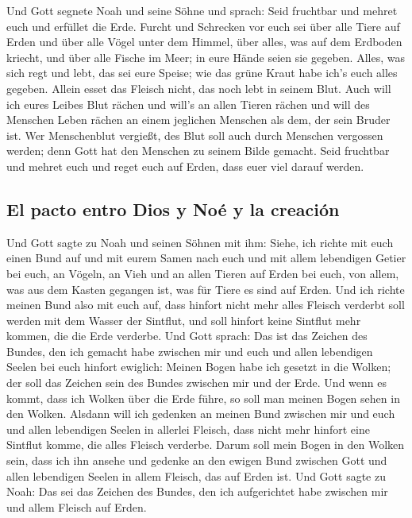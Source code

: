  Und Gott segnete Noah und seine Söhne und sprach: Seid
fruchtbar und mehret euch und erfüllet die Erde.  Furcht
und Schrecken vor euch sei über alle Tiere auf Erden und über alle Vögel
unter dem Himmel, über alles, was auf dem Erdboden kriecht, und über
alle Fische im Meer; in eure Hände seien sie gegeben. 
Alles, was sich regt und lebt, das sei eure Speise; wie das grüne Kraut
habe ich's euch alles gegeben.  Allein esset das Fleisch
nicht, das noch lebt in seinem Blut.  Auch will ich eures
Leibes Blut rächen und will's an allen Tieren rächen und will des
Menschen Leben rächen an einem jeglichen Menschen als dem, der sein
Bruder ist.  Wer Menschenblut vergießt, des Blut soll auch
durch Menschen vergossen werden; denn Gott hat den Menschen zu seinem
Bilde gemacht.  Seid fruchtbar und mehret euch und reget
euch auf Erden, dass euer viel darauf werden.

\hypertarget{el-pacto-entro-dios-y-nouxe9-y-la-creaciuxf3n}{%
\subsection{El pacto entro Dios y Noé y la
creación}\label{el-pacto-entro-dios-y-nouxe9-y-la-creaciuxf3n}}

 Und Gott sagte zu Noah und seinen Söhnen mit ihm:
 Siehe, ich richte mit euch einen Bund auf und mit eurem
Samen nach euch  und mit allem lebendigen Getier bei
euch, an Vögeln, an Vieh und an allen Tieren auf Erden bei euch, von
allem, was aus dem Kasten gegangen ist, was für Tiere es sind auf Erden.
 Und ich richte meinen Bund also mit euch auf, dass
hinfort nicht mehr alles Fleisch verderbt soll werden mit dem Wasser der
Sintflut, und soll hinfort keine Sintflut mehr kommen, die die Erde
verderbe.  Und Gott sprach: Das ist das Zeichen des
Bundes, den ich gemacht habe zwischen mir und euch und allen lebendigen
Seelen bei euch hinfort ewiglich:  Meinen Bogen habe ich
gesetzt in die Wolken; der soll das Zeichen sein des Bundes zwischen mir
und der Erde.  Und wenn es kommt, dass ich Wolken über
die Erde führe, so soll man meinen Bogen sehen in den Wolken.
 Alsdann will ich gedenken an meinen Bund zwischen mir
und euch und allen lebendigen Seelen in allerlei Fleisch, dass nicht
mehr hinfort eine Sintflut komme, die alles Fleisch verderbe.
 Darum soll mein Bogen in den Wolken sein, dass ich ihn
ansehe und gedenke an den ewigen Bund zwischen Gott und allen lebendigen
Seelen in allem Fleisch, das auf Erden ist.  Und Gott
sagte zu Noah: Das sei das Zeichen des Bundes, den ich aufgerichtet habe
zwischen mir und allem Fleisch auf Erden.

